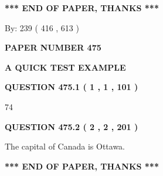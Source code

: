 \documentclass[12pt]{article}
\begin{document}
 
   
   
 \vspace{0.2in}
 
   
   
   
   
\vspace{1.0in} 
{\textbf{\large{ *** END OF PAPER, THANKS *** }}} 
   
   
\hspace{1.0in} By: 
 239 ( 416 ,  613 )
   
   
   
   
\newpage 
\setcounter{page}{ 
   475001 } 
   
   
   
   
 {\textbf{ \Large{ PAPER NUMBER  475  }}}
   
   
\vspace{0.2in}
   
   
   
   
   
   
 \vspace{0.2in}
{\LARGE {\textbf{ A QUICK TEST EXAMPLE}}}
   
   
  
\vspace{0.2in}
  
{\textbf{\Large{QUESTION
475.1 
 ( 1 , 1 , 101 )
}}}
  
  
 
 
\noindent{}

74
 
 
  
\vspace{0.2in}
  
{\textbf{\Large{QUESTION
475.2 
 ( 2 , 2 , 201 )
}}}
  
  
 
 
\noindent{}
 
 
The capital of Canada is Ottawa.
 
 
 
 
   
   
 \vspace{0.2in}
 
   
   
   
   
\vspace{1.0in} 
{\textbf{\large{ *** END OF PAPER, THANKS *** }}} 
   
\end{document}
